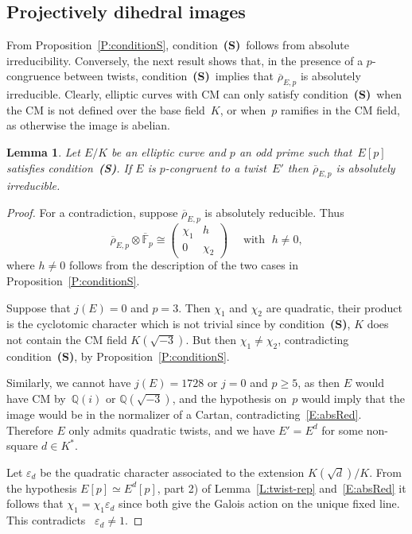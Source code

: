 \documentclass[12pt, reqno]{amsart}
\newcommand{\F}{\mathbb{F}}
\newcommand{\Fbar}{{\overline{\F}}}
\newcommand{\Q}{\mathbb{Q}}
\newcommand{\rhobar}{{\overline{\rho}}}
\newcommand{\eps}{\varepsilon}
\numberwithin{equation}{section}
\newtheorem{lemma}[theorem]{Lemma}
\theoremstyle{definition}
\theoremstyle{remark}
\newcommand{\condS}{condition~{\bf (S)}}
\begin{document}
\subsection{Projectively dihedral images}
From Proposition~\ref{P:conditionS}, \condS\ follows from
absolute irreducibility.  Conversely, the next result shows that, in
the presence of a $p$-congruence between twists, \condS\
implies that $\rhobar_{E,p}$ is absolutely irreducible.  Clearly,
elliptic curves with CM can only satisfy \condS\ when the
CM is not defined over the base field~$K$, or when~$p$ ramifies in the
CM field, as otherwise the image is abelian.

\begin{lemma} \label{L:noCyclic}
Let $E/K$ be an elliptic curve and $p$ an odd prime such that~$E[p]$
satisfies \condS.  If $E$ is $p$-congruent to a
twist~$E'$ then $\rhobar_{E,p}$ is absolutely irreducible.
\end{lemma}
\begin{proof}
For a contradiction, suppose $\rhobar_{E,p}$ is absolutely reducible. Thus
\begin{equation} \label{E:absRed}
  \rhobar_{E,p} \otimes \Fbar_p \cong 
 \begin{pmatrix}
 \chi_1 & h \\ 0 &\chi_2
 \end{pmatrix} \quad \text{ with } \; h \neq 0, 
\end{equation} 
where $h \neq 0$ follows from 
the description of the two cases
in Proposition~\ref{P:conditionS}.

Suppose that $j(E)=0$ and $p=3$.  Then $\chi_1$ and $\chi_2$ are
quadratic, their product is the cyclotomic character which is not
trivial since by \condS, $K$ does not contain the CM field
$K(\sqrt{-3})$.  But then $\chi_1\not=\chi_2$, contradicting
\condS, by Proposition~\ref{P:conditionS}.

Similarly, we cannot have $j(E) = 1728$ or $j=0$ and $p\ge5$, as then
$E$ would have CM by~$\Q(i)$ or $\Q(\sqrt{-3})$, and the hypothesis
on~$p$ would imply that the image would be in the normalizer of a
Cartan, contradicting~\eqref{E:absRed}. Therefore $E$ only admits
quadratic twists, and we have $E' = E^d$ for some non-square $d \in
K^*$.

Let $\eps_d$ be the quadratic character associated to the extension
$K(\sqrt{d})/K$. From the hypothesis $E[p] \simeq E^d[p]$, part 2) of
Lemma~\ref{L:twist-rep} and~\eqref{E:absRed} it follows that $\chi_1
=\chi_1\eps_d$ since both give the Galois action on the unique fixed
line. This contradicts ~$\eps_d \neq 1$.
\end{proof}
\end{document}
